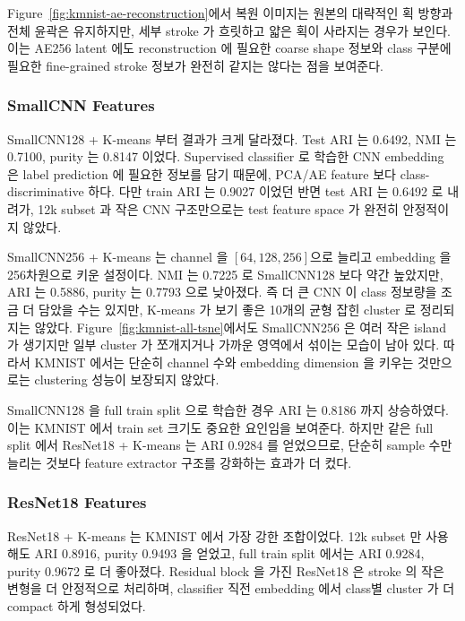 \documentclass[11pt]{article}
\begin{document}
Figure~\ref{fig:kmnist-ae-reconstruction}에서 복원 이미지는 원본의 대략적인 획 방향과 전체 윤곽은 유지하지만, 세부 stroke 가 흐릿하고 얇은 획이 사라지는 경우가 보인다.
이는 AE256 latent 에도 reconstruction 에 필요한 coarse shape 정보와 class 구분에 필요한 fine-grained stroke 정보가 완전히 같지는 않다는 점을 보여준다.

\subsubsection{SmallCNN Features}

SmallCNN128 + K-means 부터 결과가 크게 달라졌다.
Test ARI 는 0.6492, NMI 는 0.7100, purity 는 0.8147 이었다.
Supervised classifier 로 학습한 CNN embedding 은 label prediction 에 필요한 정보를 담기 때문에, PCA/AE feature 보다 class-discriminative 하다.
다만 train ARI 는 0.9027 이었던 반면 test ARI 는 0.6492 로 내려가, 12k subset 과 작은 CNN 구조만으로는 test feature space 가 완전히 안정적이지 않았다.

SmallCNN256 + K-means 는 channel 을 \([64,128,256]\)으로 늘리고 embedding 을 256차원으로 키운 설정이다.
NMI 는 0.7225 로 SmallCNN128 보다 약간 높았지만, ARI 는 0.5886, purity 는 0.7793 으로 낮아졌다.
즉 더 큰 CNN 이 class 정보량을 조금 더 담았을 수는 있지만, K-means 가 보기 좋은 10개의 균형 잡힌 cluster 로 정리되지는 않았다.
Figure~\ref{fig:kmnist-all-tsne}에서도 SmallCNN256 은 여러 작은 island 가 생기지만 일부 cluster 가 쪼개지거나 가까운 영역에서 섞이는 모습이 남아 있다.
따라서 KMNIST 에서는 단순히 channel 수와 embedding dimension 을 키우는 것만으로는 clustering 성능이 보장되지 않았다.

SmallCNN128 을 full train split 으로 학습한 경우 ARI 는 0.8186 까지 상승하였다.
이는 KMNIST 에서 train set 크기도 중요한 요인임을 보여준다.
하지만 같은 full split 에서 ResNet18 + K-means 는 ARI 0.9284 를 얻었으므로, 단순히 sample 수만 늘리는 것보다 feature extractor 구조를 강화하는 효과가 더 컸다.

\subsubsection{ResNet18 Features}

ResNet18 + K-means 는 KMNIST 에서 가장 강한 조합이었다.
12k subset 만 사용해도 ARI 0.8916, purity 0.9493 을 얻었고, full train split 에서는 ARI 0.9284, purity 0.9672 로 더 좋아졌다.
Residual block 을 가진 ResNet18 은 stroke 의 작은 변형을 더 안정적으로 처리하며, classifier 직전 embedding 에서 class별 cluster 가 더 compact 하게 형성되었다.
\end{document}
